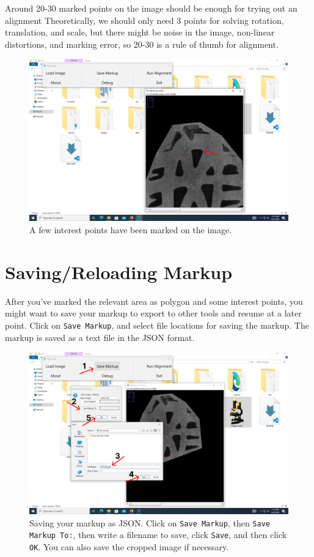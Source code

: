 \documentclass[a4paper, oneside]{memoir}
\begin{document}
Around 20-30 marked points on the image should be enough for trying out an alignment
Theoretically, we should only need 3 points for solving rotation, translation, and scale,
but there might be noise in the image, non-linear distortions, and marking error, so 20-30
is a rule of thumb for alignment.

\begin{figure}[H]
\begin{center}
	\includegraphics[width=0.8\linewidth]{images/step_4e-anno.png}
\end{center}
\caption{A few interest points have been marked on the image.}
\label{fig:step4e}
\end{figure}

\section{Saving/Reloading Markup}

After you've marked the relevant area as polygon and some interest points, you might want
to save your markup to export to other tools and resume at a later point. Click on
\texttt{Save Markup}, and select file locations for saving the markup. The markup is saved
as a text file in the JSON format.

\begin{figure}[H]
\begin{center}
	\includegraphics[width=0.8\linewidth]{images/step_5a-anno.png}
\end{center}
\caption{Saving your markup as JSON. Click on \texttt{Save Markup}, then \texttt{Save
Markup To:}, then write a filename to save, click \texttt{Save}, and then click
\texttt{OK}. You can also save the cropped image if necessary.}
\label{fig:step5a}
\end{figure}
\end{document}
